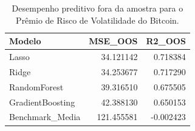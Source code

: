 \begin{table}
\caption{Desempenho preditivo fora da amostra para o Prêmio de Risco de Volatilidade do Bitcoin.}
\label{tab:cap8_oos_performance}
\begin{tabular}{lrr}
\toprule
Modelo & MSE_OOS & R2_OOS \\
\midrule
Lasso & 34.121142 & 0.718384 \\
Ridge & 34.253677 & 0.717290 \\
RandomForest & 39.316510 & 0.675505 \\
GradientBoosting & 42.388130 & 0.650153 \\
Benchmark_Media & 121.455581 & -0.002423 \\
\bottomrule
\end{tabular}
\end{table}
